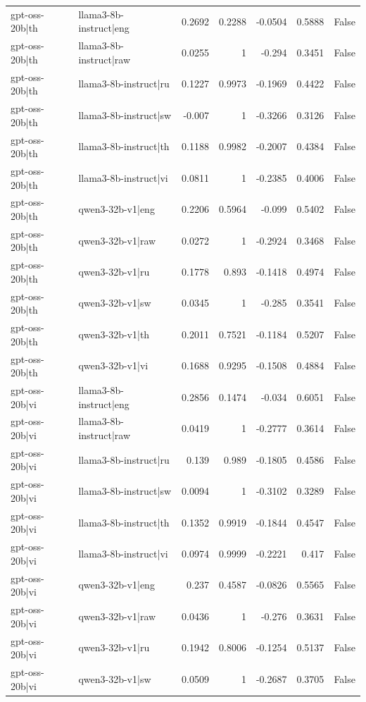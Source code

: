 \begin{table}
\begin{tabular}{l l r r r r l}
gpt-oss-20b|th & llama3-8b-instruct|eng & 0.2692 & 0.2288 & -0.0504 & 0.5888 & False \\
gpt-oss-20b|th & llama3-8b-instruct|raw & 0.0255 & 1 & -0.294 & 0.3451 & False \\
gpt-oss-20b|th & llama3-8b-instruct|ru & 0.1227 & 0.9973 & -0.1969 & 0.4422 & False \\
gpt-oss-20b|th & llama3-8b-instruct|sw & -0.007 & 1 & -0.3266 & 0.3126 & False \\
gpt-oss-20b|th & llama3-8b-instruct|th & 0.1188 & 0.9982 & -0.2007 & 0.4384 & False \\
gpt-oss-20b|th & llama3-8b-instruct|vi & 0.0811 & 1 & -0.2385 & 0.4006 & False \\
gpt-oss-20b|th & qwen3-32b-v1|eng & 0.2206 & 0.5964 & -0.099 & 0.5402 & False \\
gpt-oss-20b|th & qwen3-32b-v1|raw & 0.0272 & 1 & -0.2924 & 0.3468 & False \\
gpt-oss-20b|th & qwen3-32b-v1|ru & 0.1778 & 0.893 & -0.1418 & 0.4974 & False \\
gpt-oss-20b|th & qwen3-32b-v1|sw & 0.0345 & 1 & -0.285 & 0.3541 & False \\
gpt-oss-20b|th & qwen3-32b-v1|th & 0.2011 & 0.7521 & -0.1184 & 0.5207 & False \\
gpt-oss-20b|th & qwen3-32b-v1|vi & 0.1688 & 0.9295 & -0.1508 & 0.4884 & False \\
gpt-oss-20b|vi & llama3-8b-instruct|eng & 0.2856 & 0.1474 & -0.034 & 0.6051 & False \\
gpt-oss-20b|vi & llama3-8b-instruct|raw & 0.0419 & 1 & -0.2777 & 0.3614 & False \\
gpt-oss-20b|vi & llama3-8b-instruct|ru & 0.139 & 0.989 & -0.1805 & 0.4586 & False \\
gpt-oss-20b|vi & llama3-8b-instruct|sw & 0.0094 & 1 & -0.3102 & 0.3289 & False \\
gpt-oss-20b|vi & llama3-8b-instruct|th & 0.1352 & 0.9919 & -0.1844 & 0.4547 & False \\
gpt-oss-20b|vi & llama3-8b-instruct|vi & 0.0974 & 0.9999 & -0.2221 & 0.417 & False \\
gpt-oss-20b|vi & qwen3-32b-v1|eng & 0.237 & 0.4587 & -0.0826 & 0.5565 & False \\
gpt-oss-20b|vi & qwen3-32b-v1|raw & 0.0436 & 1 & -0.276 & 0.3631 & False \\
gpt-oss-20b|vi & qwen3-32b-v1|ru & 0.1942 & 0.8006 & -0.1254 & 0.5137 & False \\
gpt-oss-20b|vi & qwen3-32b-v1|sw & 0.0509 & 1 & -0.2687 & 0.3705 & False \\

\end{tabular}
\end{table}
